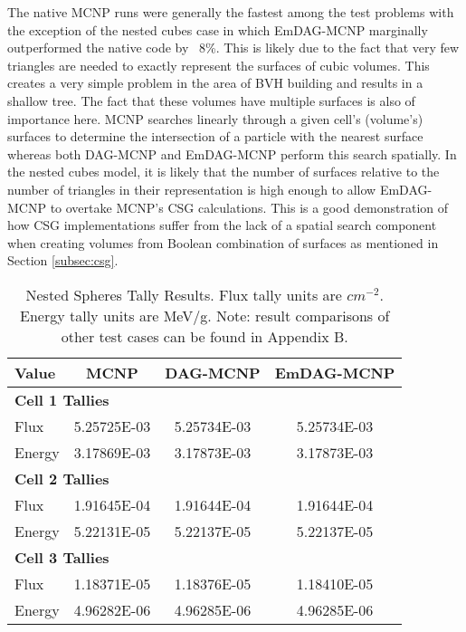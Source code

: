 The native MCNP runs were generally the fastest among the test problems with the
exception of the nested cubes case in which EmDAG-MCNP marginally outperformed
the native code by ~8\%. This is likely due to the fact that very few triangles
are needed to exactly represent the surfaces of cubic volumes. This creates a
very simple problem in the area of BVH building and results in a shallow
tree. The fact that these volumes have multiple surfaces is also of importance
here. MCNP searches linearly through a given cell's (volume's) surfaces to
determine the intersection of a particle with the nearest surface whereas both
DAG-MCNP and EmDAG-MCNP perform this search spatially. In the nested cubes
model, it is likely that the number of surfaces relative to the number of
triangles in their representation is high enough to allow EmDAG-MCNP to overtake
MCNP's CSG calculations. This is a good demonstration of how CSG implementations
suffer from the lack of a spatial search component when creating volumes from
Boolean combination of surfaces as mentioned in Section \ref{subsec:csg}.

\begin{table}[H]
  \small
  \begin{center}
    \begin{tabular}{lccc}
      \toprule
      Value & MCNP & DAG-MCNP & EmDAG-MCNP \\
      \toprule
      \multicolumn{4}{l}{\textbf{Cell 1 Tallies}} \\
      \hline
      Flux  & 5.25725E-03 & 5.25734E-03 & 5.25734E-03 \\
      Energy  & 3.17869E-03 &  3.17873E-03 &  3.17873E-03 \\
      \hline
      \multicolumn{4}{l}{\textbf{Cell 2 Tallies}} \\
      \hline
      Flux  & 1.91645E-04 & 1.91644E-04 & 1.91644E-04 \\
      Energy  & 5.22131E-05 & 5.22137E-05 & 5.22137E-05 \\
      \hline
      \multicolumn{4}{l}{\textbf{Cell 3 Tallies}} \\
      \hline
      Flux  & 1.18371E-05 & 1.18376E-05 & 1.18410E-05 \\
      Energy  & 4.96282E-06 & 4.96285E-06 & 4.96285E-06 \\
      \bottomrule
                        
    \end{tabular}
    \caption{Nested Spheres Tally Results. Flux tally units are
      $cm^{-2}$. Energy tally units are MeV/g. Note: result comparisons of other
      test cases can be found in Appendix B.}
    \label{nestedspheres}
  \end{center}
\end{table}


